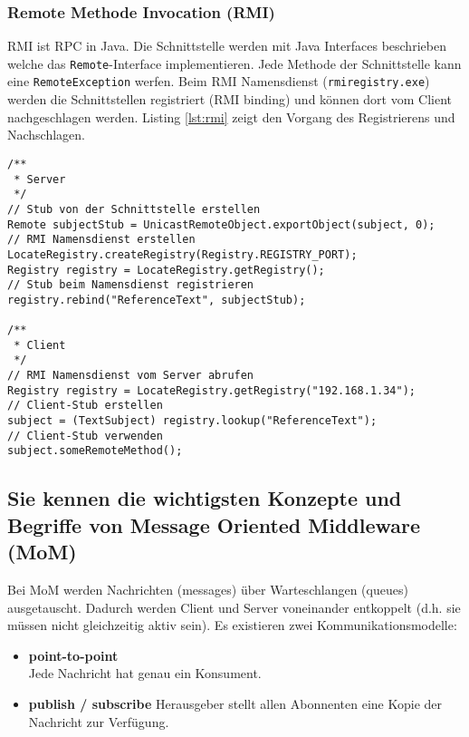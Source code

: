 \subsubsection{Remote Methode Invocation (RMI)}

RMI ist RPC in Java. Die Schnittstelle werden mit Java Interfaces beschrieben welche das \texttt{Remote}-Interface implementieren. Jede Methode der Schnittstelle kann eine \texttt{RemoteException} werfen. Beim RMI Namensdienst (\texttt{rmiregistry.exe}) werden die Schnittstellen registriert (RMI binding) und können dort vom Client nachgeschlagen werden. Listing \ref{lst:rmi} zeigt den Vorgang des Registrierens und Nachschlagen.

\begin{lstlisting}[caption={RMI Binding},label=lst:rmi]
/**
 * Server
 */
// Stub von der Schnittstelle erstellen
Remote subjectStub = UnicastRemoteObject.exportObject(subject, 0);
// RMI Namensdienst erstellen
LocateRegistry.createRegistry(Registry.REGISTRY_PORT);
Registry registry = LocateRegistry.getRegistry();
// Stub beim Namensdienst registrieren
registry.rebind("ReferenceText", subjectStub);

/**
 * Client
 */
// RMI Namensdienst vom Server abrufen
Registry registry = LocateRegistry.getRegistry("192.168.1.34");
// Client-Stub erstellen
subject = (TextSubject) registry.lookup("ReferenceText");
// Client-Stub verwenden
subject.someRemoteMethod();
\end{lstlisting}

\subsection{Sie kennen die wichtigsten Konzepte und Begriffe von Message Oriented Middleware (MoM)}

Bei \ac{MoM} werden Nachrichten (messages) über Warteschlangen (queues) ausgetauscht. Dadurch werden Client und Server voneinander entkoppelt (d.h. sie müssen nicht gleichzeitig aktiv sein). Es existieren zwei Kommunikationsmodelle:

\begin{itemize}
	\item \textbf{point-to-point} \\
		  Jede Nachricht hat genau ein Konsument.
		  
	\item \textbf{publish / subscribe}
		  Herausgeber stellt allen Abonnenten eine Kopie der Nachricht zur Verfügung.
\end{itemize}

